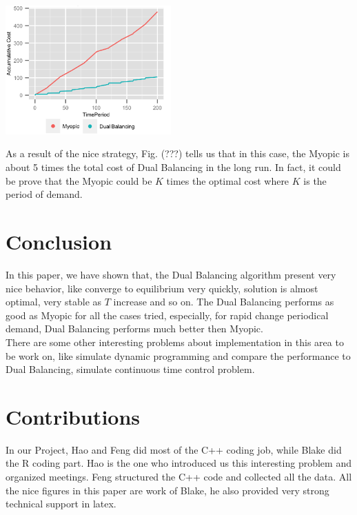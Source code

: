 \documentclass[twoside]{article}
\begin{document}
\begin{multicols}{2}
 \begin{center}
  \includegraphics[width=2.5in]{figures/MyopicBadAccumulativeCostWriteup.png}
  \end{center}
  As a result of the nice strategy, Fig. (???) tells us that in this case, the Myopic is about 5 times the total cost of Dual Balancing in the long run. In fact, it could be prove that the Myopic could be $K$ times the optimal cost where $K$ is the period of demand.

\section{Conclusion}

In this paper, we have shown that, the Dual Balancing algorithm present very nice behavior, like converge to equilibrium very quickly, solution is almost optimal, very stable as $T$ increase and so on. The Dual Balancing performs as good as Myopic for all the cases tried, especially, for rapid change periodical demand, Dual Balancing performs much better then Myopic.\\
There are some other interesting problems about implementation in this area to be work on, like simulate dynamic programming and compare the performance to Dual Balancing, simulate continuous time control problem. 

\section{Contributions}
In our Project, Hao and Feng did most of the C++ coding job, while Blake did the R coding part. Hao is the one who introduced us this interesting problem and organized meetings. Feng structured the C++ code and collected all the data. All the nice figures in this paper are work of Blake, he also provided very strong technical support in latex. 



\end{multicols}
\end{document}
